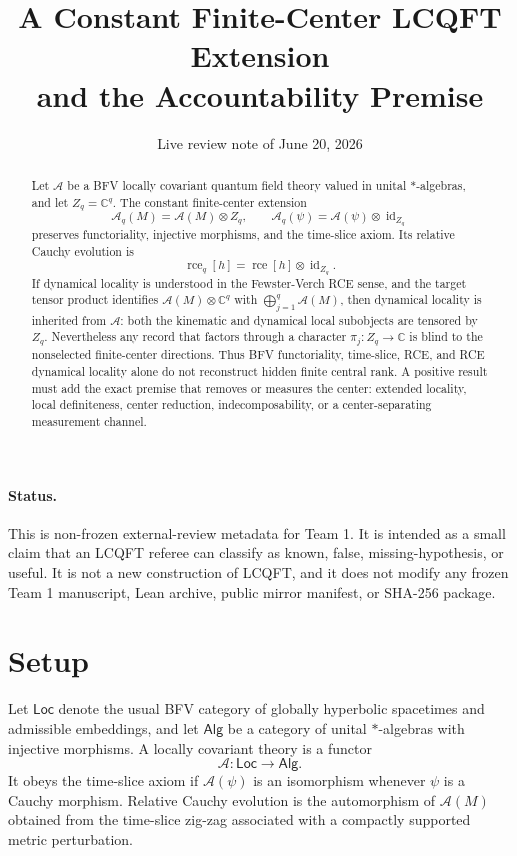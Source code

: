 \documentclass[12pt]{article}
\title{A Constant Finite-Center LCQFT Extension\\
and the Accountability Premise}
\author{}
\date{Live review note of June 20, 2026}
\theoremstyle{remark}
\newcommand{\A}{\mathcal A}
\newcommand{\C}{\mathbb C}
\newcommand{\rce}{\operatorname{rce}}
\begin{document}
\maketitle

\begin{abstract}
Let \(\A\) be a BFV locally covariant quantum field theory valued in unital
\(*\)-algebras, and let \(Z_q=\C^q\).  The constant finite-center extension
\[
  \A_q(M)=\A(M)\otimes Z_q,\qquad
  \A_q(\psi)=\A(\psi)\otimes \operatorname{id}_{Z_q}
\]
preserves functoriality, injective morphisms, and the time-slice axiom.  Its
relative Cauchy evolution is
\[
  \rce_q[h]=\rce[h]\otimes \operatorname{id}_{Z_q}.
\]
If dynamical locality is understood in the Fewster-Verch RCE sense, and the
target tensor product identifies \(\A(M)\otimes \C^q\) with
\(\bigoplus_{j=1}^q\A(M)\), then dynamical locality is inherited from
\(\A\): both the kinematic and dynamical local subobjects are tensored by
\(Z_q\).  Nevertheless any record that factors through a character
\(\pi_j:Z_q\to \C\) is blind to the nonselected finite-center directions.  Thus
BFV functoriality, time-slice, RCE, and RCE dynamical locality alone do not
reconstruct hidden finite central rank.  A positive result must add the exact
premise that removes or measures the center: extended locality, local
definiteness, center reduction, indecomposability, or a center-separating
measurement channel.
\end{abstract}

\paragraph{Status.}
This is non-frozen external-review metadata for Team 1.  It is intended as a
small claim that an LCQFT referee can classify as known, false,
missing-hypothesis, or useful.  It is not a new construction of LCQFT, and it
does not modify any frozen Team 1 manuscript, Lean archive, public mirror
manifest, or SHA-256 package.

\section{Setup}

Let \(\mathsf{Loc}\) denote the usual BFV category of globally hyperbolic
spacetimes and admissible embeddings, and let \(\mathsf{Alg}\) be a category of
unital \(*\)-algebras with injective morphisms.  A locally covariant theory is
a functor
\[
  \A:\mathsf{Loc}\longrightarrow \mathsf{Alg}.
\]
It obeys the time-slice axiom if \(\A(\psi)\) is an isomorphism whenever
\(\psi\) is a Cauchy morphism.  Relative Cauchy evolution is the automorphism
of \(\A(M)\) obtained from the time-slice zig-zag associated with a compactly
supported metric perturbation.
\end{document}
